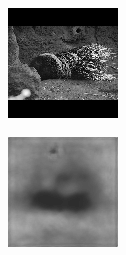 \begin{figure}[H]
  \setcounter{subfigure}{0}
  \begin{subfigure}[t]{0.13\textwidth}
    \centering
    \includegraphics[width=\linewidth]{img/one-trial/stimulus_3.png}
  \end{subfigure}
  \begin{subfigure}[t]{0.13\textwidth}
    \centering
    \includegraphics[width=\linewidth]{img/one-trial/prediction_3_l1.png}

\end{subfigure}
\end{figure}
